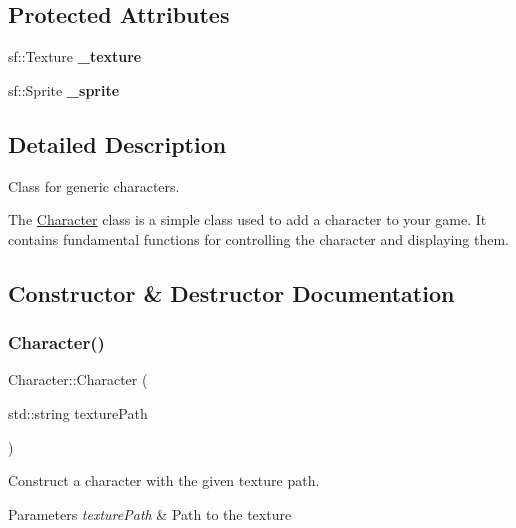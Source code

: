 \subsection*{Protected Attributes}
\begin{DoxyCompactItemize}
\item 
\mbox{\label{class_character_ae924928a3fbea152f422fa0ba3e0f8e2}} 
sf\+::\+Texture {\bfseries \+\_\+texture}
\item 
\mbox{\label{class_character_ab3b89d967b817bc3e199ed70f6b6277a}} 
sf\+::\+Sprite {\bfseries \+\_\+sprite}
\end{DoxyCompactItemize}


\subsection{Detailed Description}
Class for generic characters. 

The \mbox{\hyperlink{class_character}{Character}} class is a simple class used to add a character to your game. It contains fundamental functions for controlling the character and displaying them. 

\subsection{Constructor \& Destructor Documentation}
\mbox{\label{class_character_a9c0bcc7f37b218c920d014bf722037fa}} 
\subsubsection{\texorpdfstring{Character()}{Character()}}
{\footnotesize\ttfamily Character\+::\+Character (\begin{DoxyParamCaption}\item[{std\+::string}]{texture\+Path }\end{DoxyParamCaption})}



Construct a character with the given texture path. 


\begin{DoxyParams}{Parameters}
{\em texture\+Path} & Path to the texture \\
\hline
\end{DoxyParams}


